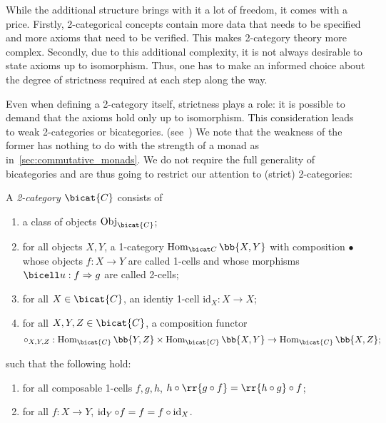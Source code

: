 While the additional structure brings with it a lot of freedom, it comes with a price.
Firstly, 2-categorical concepts contain more data that needs to be specified and
more axioms that need to be verified. This makes 2-category theory more complex.
Secondly, due to this additional complexity, it is not always desirable to state axioms up to
isomorphism. Thus, one has to make an informed choice about the degree of strictness
required at each step along the way.

Even when defining a 2-category itself, strictness plays a role: it is possible to
demand that the axioms hold only up to isomorphism. This consideration leads to weak
2-categories or bicategories. (see~\cite{leinster1998}) We note that the weakness of the former
has nothing to do with the strength of a monad as in~\ref{sec:commutative_monads}.
We do not require the full generality of bicategories and are thus going
to restrict our attention to (strict) 2-categories:

\begin{definition}\label{def:2category}
  A \emph{2-category} $\bicat{C}$ consists of \begin{enumerate}
    \item a class of objects $\Obj_{\bicat{C}}$;
    \item for all objects $X,Y$, a 1-category $\Hom_{\bicat C}\bb{X,Y}$ with
      composition $\bullet$ whose objects $f:X\to Y$ are called 1-cells and
      whose morphisms $\bicell u:f\Rightarrow g$ are called 2-cells;
    \item for all $X\in\bicat{C}$, an identiy 1-cell $\text{id}_X:X\to X$;
    \item for all $X,Y,Z\in\bicat{C}$, a composition functor
      \begin{equation}
        \label{eq:bicategory_composition}
        \circ_{X,Y,Z}:\Hom_{\bicat{C}}\bb{Y,Z}\times\Hom_{\bicat{C}}\bb{X,Y}
        \to\Hom_{\bicat{C}}\bb{X,Z};
      \end{equation}
  \end{enumerate}
  such that the following hold:
  \begin{enumerate}
    \item for all composable 1-cells $f,g,h$,
      $h\circ\rr{g\circ f}=\rr{h\circ g}\circ f$;
    \item for all $f:X\to Y$, $\operatorname{id}_Y\circ f = f = f\circ \operatorname{id}_X$.
  \end{enumerate}
\end{definition}

